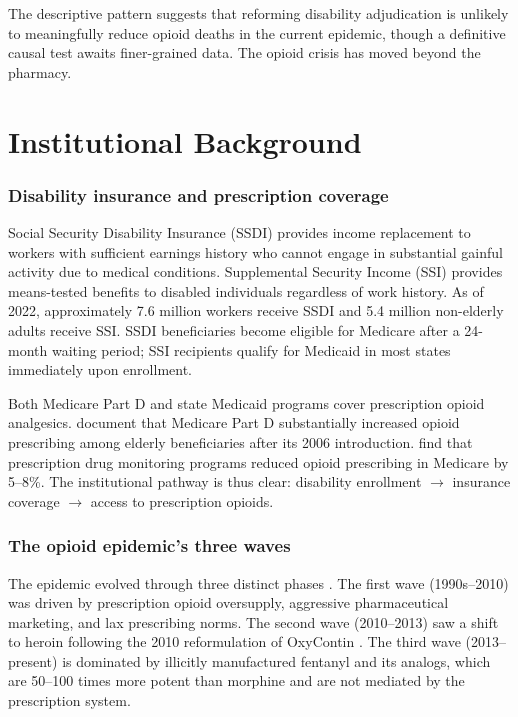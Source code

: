 \documentclass[12pt]{article}
\begin{document}
The descriptive pattern suggests that reforming disability adjudication is unlikely to meaningfully reduce opioid deaths in the current epidemic, though a definitive causal test awaits finer-grained data. The opioid crisis has moved beyond the pharmacy.

\section{Institutional Background}

\subsubsection*{Disability insurance and prescription coverage} Social Security Disability Insurance (SSDI) provides income replacement to workers with sufficient earnings history who cannot engage in substantial gainful activity due to medical conditions. Supplemental Security Income (SSI) provides means-tested benefits to disabled individuals regardless of work history. As of 2022, approximately 7.6 million workers receive SSDI and 5.4 million non-elderly adults receive SSI. SSDI beneficiaries become eligible for Medicare after a 24-month waiting period; SSI recipients qualify for Medicaid in most states immediately upon enrollment.

Both Medicare Part D and state Medicaid programs cover prescription opioid analgesics. \citet{powell2021} document that Medicare Part D substantially increased opioid prescribing among elderly beneficiaries after its 2006 introduction. \citet{buchmueller2020} find that prescription drug monitoring programs reduced opioid prescribing in Medicare by 5--8\%. The institutional pathway is thus clear: disability enrollment $\rightarrow$ insurance coverage $\rightarrow$ access to prescription opioids.

\subsubsection*{The opioid epidemic's three waves} The epidemic evolved through three distinct phases \citep{cutler2022}. The first wave (1990s--2010) was driven by prescription opioid oversupply, aggressive pharmaceutical marketing, and lax prescribing norms. The second wave (2010--2013) saw a shift to heroin following the 2010 reformulation of OxyContin \citep{evans2019, alpert2022}. The third wave (2013--present) is dominated by illicitly manufactured fentanyl and its analogs, which are 50--100 times more potent than morphine and are not mediated by the prescription system.
\end{document}
